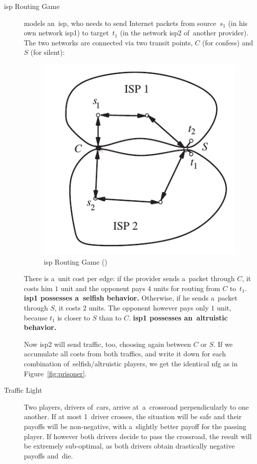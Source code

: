 \begin{description}
  \item [\acrshort{isp} Routing Game] models an~\acrfull{isp}, who needs to send Internet packets from source~$s_1$ (in his own network \acrshort{isp}1) to target~$t_1$ (in the network \acrshort{isp}2 of~another provider).
    The two networks are connected via two transit points, $C$ (for confess) and $S$ (for silent):
    \begin{figure}[H]
      \centering
      \includegraphics[width=.25\paperwidth]{../img/isp.png}
      \caption[\acrshort{isp} Routing Game]{\acrshort{isp} Routing Game (\cite{AGT07})}
      \label{fig:isp-routing}
    \end{figure}
    There is a~unit cost per edge:
    if the provider sends a~packet through $C$, it costs him $1$ unit and the opponent pays $4$ units for routing from $C$ to~$t_1$.
    \textbf{\acrshort{isp}1 possesses a~selfish behavior.}
    Otherwise, if he sends a~packet through $S$, it costs $2$ units.
    The opponent however pays only $1$ unit, because $t_1$ is closer to $S$ than to $C$.
    \textbf{\acrshort{isp}1 possesses an~altruistic behavior.}

    Now \acrshort{isp}2 will send traffic, too, choosing again between $C$ or $S$.
    If we accumulate all costs from both traffics, and write it down for each combination of~selfish/altruistic players, we get the identical \acrshort{nfg} as in Figure~\ref{fig:prisoner}.

  \item [Traffic Light]
    Two players, drivers of~cars, arrive at~a~crossroad perpendicularly to one another.
    If at most 1~driver crosses, the situation will be safe and their payoffs will be non-negative, with a~slightly better payoff for the passing player.
    If however both drivers decide to pass the crossroad, the result will be extremely sub-optimal, as both drivers obtain drastically negative payoffs and~die.


\end{description}
